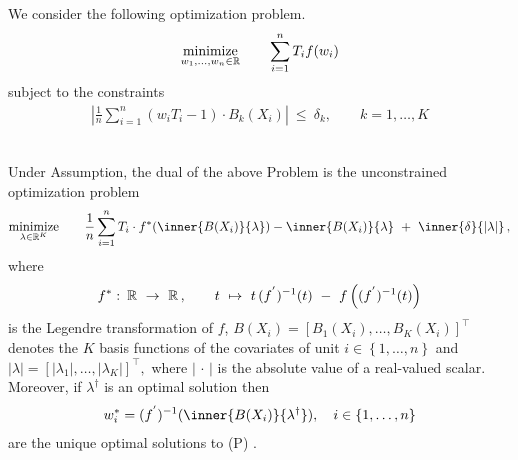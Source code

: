 We consider the following optimization problem.
  \begin{gather*}
    \underset{w_1, \ldots, w_n \in \mathbb{R}}{\mathrm{minimize}}
    \qquad
    \sum_{i = 1}^{n} T_i f(w_i)
  \end{gather*}
subject to the constraints
\begin{gather*}
    \left| 
      \frac{1}{n} 
      \sum_{i = 1}^{n} 
      (
      w_i T_i 
      - 
      1
      )
      \cdot
      B_k(X_i)
    \right|
    \ 
    \le 
    \ 
    \delta_k,
    \qquad
    k = 1, \ldots, K
\end{gather*}
\pagebreak
~\begin{ftheorem}
  Under Assumption,
  the dual of the above Problem is the unconstrained optimization problem 
  \begin{gather*}
    \underset{\lambda \in \R^K}{\mathrm{minimize}}
    \qquad
    \frac{1}{n}
    \sum_{i = 1}^{n} 
    T_i 
    \cdot
    f^*
    (
      \inner{B(X_i)}{\lambda}
    )
    -
    \inner{B(X_i)}{\lambda}
    \ 
    +
    \ 
    \inner{\delta}{\left| \lambda \right|}
    \,,
  \end{gather*}
  where
  \begin{gather*}
  f^*
  \,
  \colon
  \, 
  \R
  \ 
  \to
  \ 
  \R
  \,
  ,
  \qquad 
  t 
  \ 
  \mapsto
  \ 
    t\,(f^{'})^{-1}(t)
  \ 
    -
  \ 
    f
    \left( 
      (f^{'})^{-1}(t)
    \right)
  \end{gather*}
  is the Legendre transformation of $f$,
  $
    B(X_i)
    =
    \left[ 
      B_1(X_i)
      ,
      \ldots
      ,
      B_K(X_i)
    \right]
    ^\top
  $
  denotes the $K$ basis functions of the covariates 
  of unit $i\in \left\{ 1, \ldots, n \right\}$
  and
  $
    \left| \lambda \right|
    =
    \left[ 
      \left| \lambda_1 \right|
      ,
      \ldots
      ,
      \left| \lambda_K \right|
    \right]
    ^\top
    ,
  $
  where $\left| \,\cdot\, \right|$
  is the absolute value of a real-valued scalar.
  Moreover, if $\lambda^\dagger$
  is an optimal solution then
  \begin{gather*}
    w_i^*
    =
    (f^{'})^{-1}
    (
      \inner{B(X_i)}{\lambda^\dagger}
    )
    ,
    \quad
    i\in \left\{ 1,\ldots, n \right\}
  \end{gather*}
  are the unique optimal solutions to (P)
  .
\end{ftheorem}
